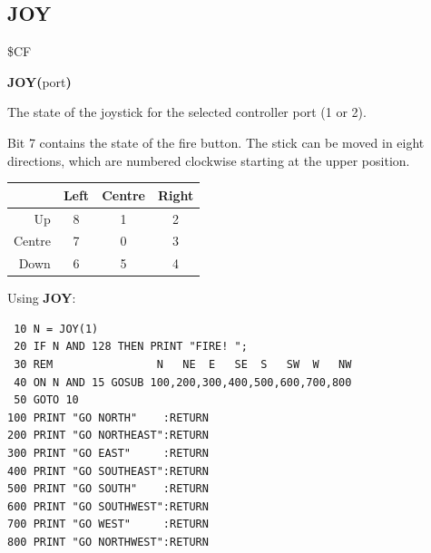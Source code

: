 \subsection{JOY}
\begin{description}[leftmargin=2cm,style=nextline]
\item [Token:] \$CF
\item [Format:] {\bf JOY(}port{\bf)}
\item [Returns:] The state of the
               joystick for the selected controller port (1 or 2).

               Bit 7 contains the state of the fire button.
               The stick can be moved in eight directions, which
               are numbered clockwise starting at the upper position.
\begin{center}
{\setlength{\tabcolsep}{1mm}
\begin{tabular}{|r|c|c|c|}
\hline
&  {\bf Left}  & {\bf Centre} & {\bf Right} \\
\hline
Up     &  8 &    1  & 2 \\
Centre &  7 &    0  & 3 \\
Down   &  6 &    5  & 4 \\
\hline
\end{tabular}
}
\end{center}

\item [Example:] Using {\bf JOY}:
\begin{tcolorbox}[colback=black,coltext=white]
\verbatimfont{\codefont}
\begin{verbatim}
 10 N = JOY(1)
 20 IF N AND 128 THEN PRINT "FIRE! ";
 30 REM                N   NE  E   SE  S   SW  W   NW
 40 ON N AND 15 GOSUB 100,200,300,400,500,600,700,800
 50 GOTO 10
100 PRINT "GO NORTH"    :RETURN
200 PRINT "GO NORTHEAST":RETURN
300 PRINT "GO EAST"     :RETURN
400 PRINT "GO SOUTHEAST":RETURN
500 PRINT "GO SOUTH"    :RETURN
600 PRINT "GO SOUTHWEST":RETURN
700 PRINT "GO WEST"     :RETURN
800 PRINT "GO NORTHWEST":RETURN
\end{verbatim}
\end{tcolorbox}
\end{description}


\newpage
